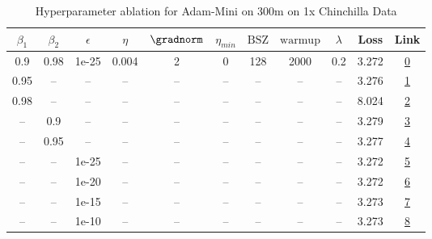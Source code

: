 \begin{table}[H]
\centering
\caption{Hyperparameter ablation for Adam-Mini on 300m on 1x Chinchilla Data}
\label{tab:ablation_adam-mini_300m_on_1x_chinchilla_data}
\begin{tabular}{ccccccccccc}
\toprule
$\beta_1$ & $\beta_2$ & $\epsilon$ & $\eta$ & $\gradnorm$ & $\eta_{min}$ & $\mathrm{BSZ}$ & $\mathrm{warmup}$ & $\lambda$ & Loss & Link \\
\midrule
0.9 & 0.98 & 1e-25 & 0.004 & 2 & 0 & 128 & 2000 & 0.2 & 3.272 & \href{https://wandb.ai/stanford-mercury/optimizer-scaling/runs/sweep-300m-6B-minimf93988lr0.004-wd0.2-minlr0-warmup2000-b10.9-b-1a622b}{0} \\
\midrule
0.95 & -- & -- & -- & -- & -- & -- & -- & -- & 3.276 & \href{https://wandb.ai/stanford-mercury/optimizer-scaling/runs/sweep-300m-6B-minic68fa6lr0.004-wd0.2-minlr0-warmup2000-b10.95-b-61c14d}{1} \\
0.98 & -- & -- & -- & -- & -- & -- & -- & -- & 8.024 & \href{https://wandb.ai/stanford-mercury/optimizer-scaling/runs/sweep-300m-6B-minie808f4lr0.004-wd0.2-minlr0-warmup2000-b10.98-b-2ad92e}{2} \\
-- & 0.9 & -- & -- & -- & -- & -- & -- & -- & 3.279 & \href{https://wandb.ai/stanford-mercury/optimizer-scaling/runs/sweep-300m-6B-minim7e5831lr0.004-wd0.2-minlr0-warmup2000-b10.9-b-3f89ca}{3} \\
-- & 0.95 & -- & -- & -- & -- & -- & -- & -- & 3.277 & \href{https://wandb.ai/stanford-mercury/optimizer-scaling/runs/sweep-300m-6B-mini3022d1lr0.004-wd0.2-minlr0-warmup2000-b10.9-b2-0db993}{4} \\
-- & -- & 1e-25 & -- & -- & -- & -- & -- & -- & 3.272 & \href{https://wandb.ai/stanford-mercury/optimizer-scaling/runs/sweep-300m-6B-minimf93988lr0.004-wd0.2-minlr0-warmup2000-b10.9-b-1a622b}{5} \\
-- & -- & 1e-20 & -- & -- & -- & -- & -- & -- & 3.272 & \href{https://wandb.ai/stanford-mercury/optimizer-scaling/runs/sweep-300m-6B-mini3ff087lr0.004-wd0.2-minlr0-warmup2000-b10.9-b2-e0d948}{6} \\
-- & -- & 1e-15 & -- & -- & -- & -- & -- & -- & 3.273 & \href{https://wandb.ai/stanford-mercury/optimizer-scaling/runs/sweep-300m-6B-minim4cb19elr0.004-wd0.2-minlr0-warmup2000-b10.9-b-4a59e2}{7} \\
-- & -- & 1e-10 & -- & -- & -- & -- & -- & -- & 3.273 & \href{https://wandb.ai/stanford-mercury/optimizer-scaling/runs/sweep-300m-6B-minim8dac9blr0.004-wd0.2-minlr0-warmup2000-b10.9-b-2ed5f7}{8} \\

\end{tabular}
\end{table}
